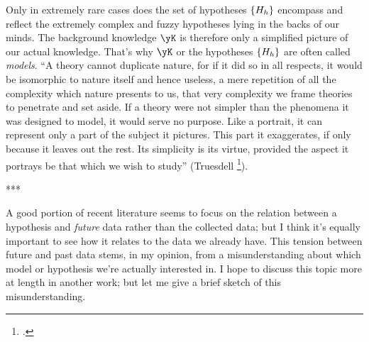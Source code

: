 \documentclass[\ifafour a4paper,12pt,\else a5paper,10pt,\fi%
onecolumn,oneside,article,%
british%
]{memoir}
\theoremstyle{remark}
\theoremstyle{innote}
\newcommand*{\citep}{\footcites}
\DeclarePairedDelimiter\set{\{}{\}}
\renewcommand*{\|}[1][]{\nonscript\,#1\vert\nonscript\;\mathopen{}}
\begin{document}
Only in extremely rare cases does the set of hypotheses $\set{H_{h}}$
encompass and reflect the extremely complex and fuzzy hypotheses lying
in the backs of our minds. The background knowledge $\yK$ is therefore only
a simplified picture of our actual knowledge. That's why $\yK$ or the
hypotheses $\set{H_{h}}$ are often called \emph{models}.\; \enquote{A
  theory cannot duplicate nature, for if it did so in all respects, it
  would be isomorphic to nature itself and hence useless, a mere repetition
  of all the complexity which nature presents to us, that very complexity
  we frame theories to penetrate and set aside. If a theory were not
  simpler than the phenomena it was designed to model, it would serve no
  purpose. Like a portrait, it can represent only a part of the subject it
  pictures. This part it exaggerates, if only because it leaves out the
  rest. Its simplicity is its virtue, provided the aspect it portrays be
  that which we wish to study} (Truesdell \citep[Prologue p.~xvi]{truesdelletal1980}).

***

A good
portion of recent literature seems to focus on the relation between a
hypothesis and \emph{future} data rather than the collected data; but I
think it's equally important to see how it relates to the data we already
have. This tension between future and past data stems, in my opinion, from
a misunderstanding about which model or hypothesis we're actually
interested in. I hope to discuss this topic more at length in another work;
but let me give a brief sketch of this misunderstanding.
\end{document}
